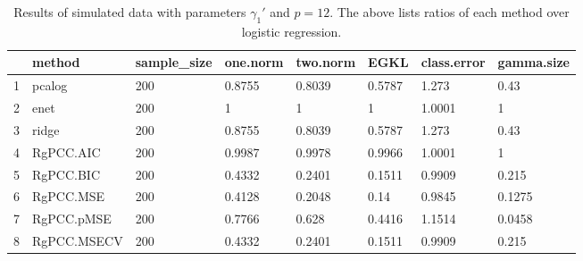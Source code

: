 \begin{table}[ht]
\centering
\begin{tabular}{rlllllll}
  \hline
 & method & sample\_size & one.norm & two.norm & EGKL & class.error & gamma.size \\ 
  \hline
1 & pcalog & 200 & 0.8755 & 0.8039 & 0.5787 & 1.273 & 0.43 \\ 
  2 & enet & 200 & 1 & 1 & 1 & 1.0001 & 1 \\ 
  3 & ridge & 200 & 0.8755 & 0.8039 & 0.5787 & 1.273 & 0.43 \\ 
  4 & RgPCC.AIC & 200 & 0.9987 & 0.9978 & 0.9966 & 1.0001 & 1 \\ 
  5 & RgPCC.BIC & 200 & 0.4332 & 0.2401 & 0.1511 & 0.9909 & 0.215 \\ 
  6 & RgPCC.MSE & 200 & 0.4128 & 0.2048 & 0.14 & 0.9845 & 0.1275 \\ 
  7 & RgPCC.pMSE & 200 & 0.7766 & 0.628 & 0.4416 & 1.1514 & 0.0458 \\ 
  8 & RgPCC.MSECV & 200 & 0.4332 & 0.2401 & 0.1511 & 0.9909 & 0.215 \\ 
   \hline
\end{tabular}
\caption{Results of simulated data with parameters $\gamma_1'$ and $p =12$. The above lists ratios of each method over logistic regression.} 
\label{fig-1'-nonlead-12-metrics-pratio}
\end{table}
